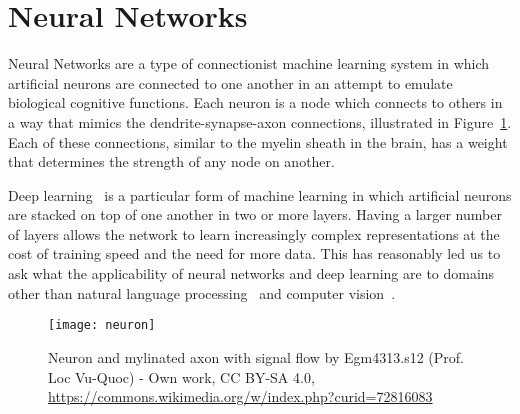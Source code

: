 \section{Neural Networks}\label{intro:nn}
Neural Networks are a type of connectionist machine learning system in which artificial neurons are connected to one another in an attempt to emulate biological cognitive functions.
Each neuron is a node which connects to others in a way that mimics the dendrite-synapse-axon connections, illustrated in Figure~\ref{fig:neuron}.
Each of these connections, similar to the myelin sheath in the brain, has a weight that determines the strength of any node on another.

Deep learning~\cite{goodfellow2016deep} is a particular form of machine learning in which artificial neurons are stacked on top of one another in two or more layers. 
Having a larger number of layers allows the network to learn increasingly complex representations at the cost of training speed and the need for more data. 
This has reasonably led us to ask what the applicability of neural networks and deep learning are to domains other than natural language processing~\cite{goldberg2016primer} and computer vision~\cite{lecun1998gradient}.

\begin{figure}
\texttt{[image: neuron]}
\centering
\caption{Neuron and mylinated axon with signal flow by Egm4313.s12 (Prof. Loc Vu-Quoc) - Own work, CC BY-SA 4.0, \url{https://commons.wikimedia.org/w/index.php?curid=72816083}}
\label{fig:neuron}
\end{figure}

